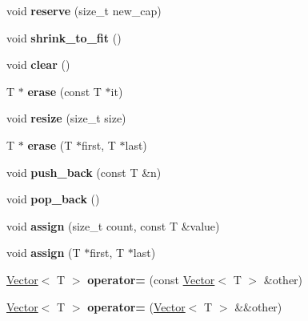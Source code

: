 \begin{DoxyCompactItemize}
void {\bfseries reserve} (size\+\_\+t new\+\_\+cap)
\item 
\mbox{\label{class_vector_ad6454ce193263b8000d4c18cb0c3a0c8}} 
void {\bfseries shrink\+\_\+to\+\_\+fit} ()
\item 
\mbox{\label{class_vector_a32ad98b135472b0ebc5d6cb3ae5d0085}} 
void {\bfseries clear} ()
\item 
\mbox{\label{class_vector_a63e2f0ebe257463780996aacb0dc6ceb}} 
T $\ast$ {\bfseries erase} (const T $\ast$it)
\item 
\mbox{\label{class_vector_ab07cfe0c5a651166f23bc7c794a28e9d}} 
void {\bfseries resize} (size\+\_\+t size)
\item 
\mbox{\label{class_vector_a92876cecd62d9780e077f362dfc5a176}} 
T $\ast$ {\bfseries erase} (T $\ast$first, T $\ast$last)
\item 
\mbox{\label{class_vector_a6e1272f7d7be9854966efc3c63ce9ea5}} 
void {\bfseries push\+\_\+back} (const T \&n)
\item 
\mbox{\label{class_vector_adcba035109febbe55cba2a25f8483ba6}} 
void {\bfseries pop\+\_\+back} ()
\item 
\mbox{\label{class_vector_ae8dfa135fec20c87550383b3ae20dff0}} 
void {\bfseries assign} (size\+\_\+t count, const T \&value)
\item 
\mbox{\label{class_vector_afa6b2a233d84f04fcaf4a58547414ca5}} 
void {\bfseries assign} (T $\ast$first, T $\ast$last)
\item 
\mbox{\label{class_vector_a0cac5c8c23daa39c8daff7dafa060377}} 
\mbox{\hyperlink{class_vector}{Vector}}$<$ T $>$ {\bfseries operator=} (const \mbox{\hyperlink{class_vector}{Vector}}$<$ T $>$ \&other)
\item 
\mbox{\label{class_vector_a21d426d4811a39d00106080c6747961b}} 
\mbox{\hyperlink{class_vector}{Vector}}$<$ T $>$ {\bfseries operator=} (\mbox{\hyperlink{class_vector}{Vector}}$<$ T $>$ \&\&other)

\end{DoxyCompactItemize}
